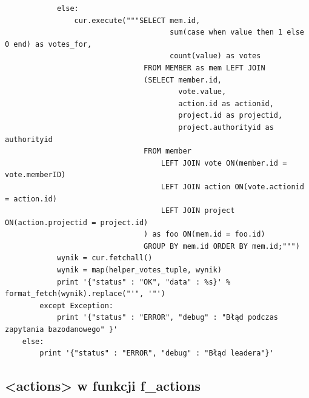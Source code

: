 \documentclass{article}
\begin{document}
\begin{verbatim}
            else:
                cur.execute("""SELECT mem.id,
                                      sum(case when value then 1 else 0 end) as votes_for,
                                      count(value) as votes 
                                FROM MEMBER as mem LEFT JOIN
                                (SELECT member.id,
                                        vote.value,
                                        action.id as actionid, 
                                        project.id as projectid, 
                                        project.authorityid as authorityid
                                FROM member
                                    LEFT JOIN vote ON(member.id = vote.memberID)
                                    LEFT JOIN action ON(vote.actionid = action.id)
                                    LEFT JOIN project ON(action.projectid = project.id)
                                ) as foo ON(mem.id = foo.id)
                                GROUP BY mem.id ORDER BY mem.id;""")
            wynik = cur.fetchall()
            wynik = map(helper_votes_tuple, wynik)
            print '{"status" : "OK", "data" : %s}' % format_fetch(wynik).replace("'", '"')  
        except Exception:  
            print '{"status" : "ERROR", "debug" : "Błąd podczas zapytania bazodanowego" }' 
    else:
        print '{"status" : "ERROR", "debug" : "Błąd leadera"}'   
\end{verbatim}












\newpage
\subsection{<actions> w funkcji f\_actions }
\end{document}
